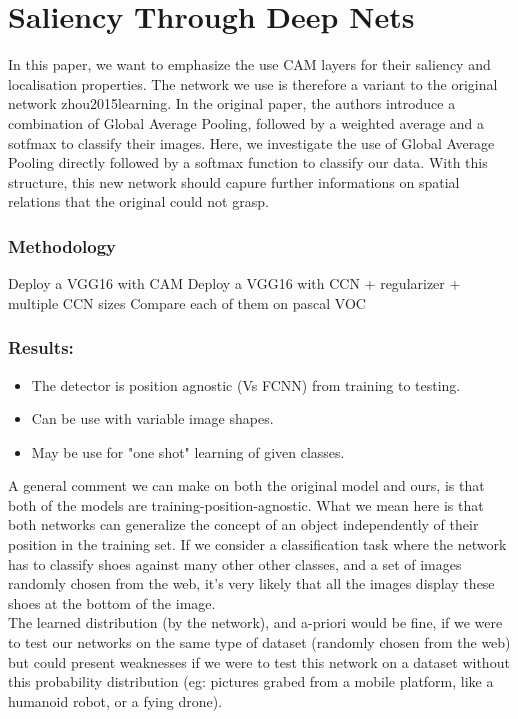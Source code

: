 \chapter{Saliency Through Deep Nets} %
\label{sec:saliency_through_deep_nets}
	
	In this paper, we want to emphasize the use CAM layers for their saliency and localisation properties.
	The network we use is therefore a variant to the original network zhou2015learning. In the original paper, the authors introduce a combination of Global Average Pooling, followed by a weighted average and a sotfmax to classify their images. Here, we investigate the use of Global Average Pooling directly followed by a softmax function to classify our data. With this structure, this new network should capure further informations on spatial relations that the original could not grasp.

	\subsection{Methodology} %
	\label{sub:methodology}

		Deploy a VGG16 with CAM 
		Deploy a VGG16 with CCN + regularizer + multiple CCN sizes
		Compare each of them on pascal VOC

	\subsection{Results:} %
	\label{sub:results_}
		
		\begin{itemize}
			\item The detector is position agnostic (Vs FCNN) from training to testing.
			\item Can be use with variable image shapes.
			\item May be use for "one shot" learning of given classes.
		\end{itemize}

	A general comment we can make on both the original model and ours, is that both of the models are training-position-agnostic. What we mean here is that both networks can generalize the concept of an object independently of their position in the training set. If we consider a classification task where the network has to classify shoes against many other other classes, and a set of images randomly chosen from the web, it's very likely that all the images display these shoes at the bottom of the image.\\
	The learned distribution (by the network), and a-priori would be fine, if we were to test our networks on the same type of dataset (randomly chosen from the web) but could present weaknesses if we were to test this network on a dataset without this probability distribution (eg: pictures grabed from a mobile platform, like a humanoid robot, or a fying drone).
